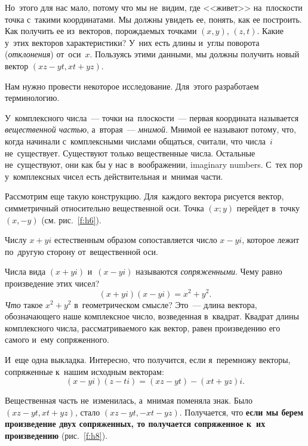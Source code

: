 Но~этого для нас мало, потому что мы не~видим, где <<живет>> на~плоскости точка с~такими
координатами. Мы должны увидеть ее, понять, как ее построить. Как получить ее из~векторов,
порождаемых точками $(x,y)$, $(z,t)$. Какие у~этих векторов характеристики? У~них есть длины и~углы
поворота (\textit{отклонения}) от~оси~$x$. Пользуясь этими данными, мы должны получить новый вектор $(xz-yt,xt+yz)$.

Нам нужно провести некоторое исследование. Для~этого разработаем терминологию.

У~комплексного числа~--- точки на~плоскости~--- первая координата называется \textit{вещественной частью},
а~вторая~--- \textit{мнимой}. Мнимой ее называют потому, что, когда начинали с~комплексными числами общаться,
считали, что числа~$i$ не~существует. Существуют только вещественные числа. Остальные не~существуют,
они как бы у нас в~воображении, imaginary numbers.
 С~тех пор у~комплексных чисел есть действительная и~мнимая
части.

Рассмотрим еще такую конструкцию. Для~каждого вектора рисуется вектор, симметричный относительно
вещественной оси. Точка $(x;y)$ перейдет в~точку $(x,-y)$ (см. рис.~\ref{f:h6}).


Числу $x+yi$ естественным образом сопоставляется число $x-yi$, которое лежит по~другую сторону
от~вещественной оси.

Числа вида $(x+yi)$ и~$(x-yi)$ называются \textit{сопряженными}.
 Чему равно произведение этих чисел?
$$
(x+yi)(x-yi)= x^{2}+y^{2}.
$$
\textit{Что} такое $x^{2} + y^{2}$ в~геометрическом смысле? Это~--- длина вектора, обозначающего наше комплексное число, возведенная в~квадрат.
Квадрат длины комплексного числа, рассматриваемого как вектор, равен произведению его
самого и~ему сопряженного.

И~еще одна выкладка. Интересно, что получится, если я~перемножу векторы, сопряженные к~нашим исходным векторам:
$$
(x-yi) (z-ti) = (xz-yt)-(xt+yz)i.
$$



Вещественная часть не~изменилась, а~мнимая поменяла знак. Было $(xz-yt, xt+yz)$, стало $(xz-yt,
-xt-yz)$. Получается, что \textbf{если мы берем произведение двух сопряженных, то получается сопряженное
к~их произведению} (рис.~\ref{f:h8}).


